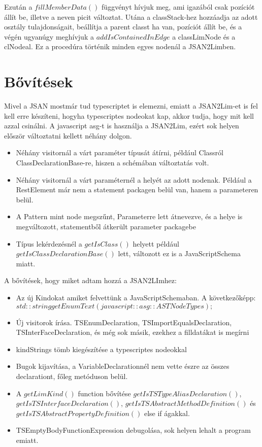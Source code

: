 \noindent

Ezután a $fillMemberData()$ függvényt hívjuk meg, ami igazából csak pozíciót állít be, illetve a neven picit változtat.
Utána a classStack-hez hozzáadja az adott osztály tulajdonságait, beállítja a parent classt ha van, pozíciót állít be, és a végén ugyanúgy meghívjuk a $addIsContainedInEdge$ a classLimNode és a clNodeal.
Ez a procedúra történik minden egyes nodenál a JSAN2Limben.

\section{Bővítések}

\noindent

Mivel a JSAN mostmár tud typescriptet is elemezni, emiatt a JSAN2Lim-et is fel kell erre készíteni, hogyha typescriptes nodeokat kap, akkor tudja, hogy mit kell azzal csinálni.
A javascript asg-t is használja a JSAN2Lim, ezért sok helyen először változtatni kellett néhány dolgon.
\begin{itemize}
      \item Néhány visitornál a várt paraméter típusát átírni, például Classról ClassDeclarationBase-re, hiszen a schémában változtatás volt.
      \item Néhány visitornál a várt paraméternél a helyét az adott nodenak. Például a RestElement már nem a statement packagen belül van, hanem a parameteren belül.
      \item A Pattern mint node megszűnt, Parameterre lett átnevezve, és a helye is megváltozott, statementből átkerült parameter packagebe
      \item Típus lekérdezésnél a $getIsClass()$ helyett például $getIsClassDeclarationBase()$ lett, változott ez is a JavaScriptSchema miatt.
\end{itemize}

A bővítések, hogy miket adtam hozzá a JSAN2LImhez:
\begin{itemize}
      \item Az új Kindokat amiket felvettünk a JavaScriptSchemaban. A következőképp: $std::string getEnumText(javascript::asg::ASTNodeTypes);$
      \item Új visitorok írása. TSEnumDeclaration, TSImportEqualsDeclaration, TSInterFaceDeclaration, és még sok másik, ezekhez a filldatákat is megírni
      \item kindStrings tömb kiegészítése a typescriptes nodeokkal
      \item Bugok kijavítása, a VariableDeclarationnél nem vette észre az összes declarationt, főleg metóduson belül.
      \item A $getLimKind()$ function bővítése $getIsTSTypeAliasDeclaration()$, $getIsTSInterfaceDeclaration()$, $getIsTSAbstractMethodDefinition()$ és $getIsTSAbstractPropertyDefinition()$ else if ágakkal.
      \item TSEmptyBodyFunctionExpression debugolása, sok helyen lehalt a program emiatt.
\end{itemize}
